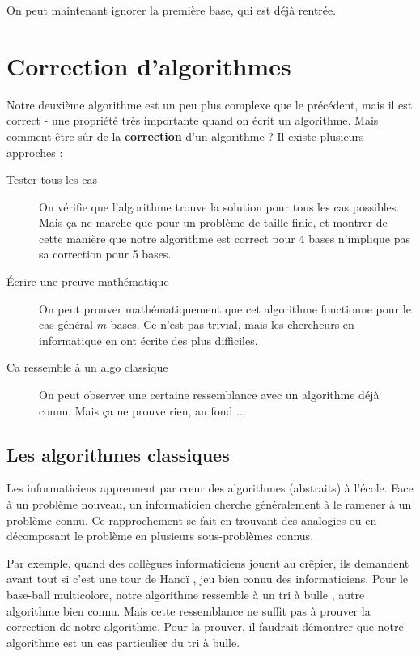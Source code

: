 \documentclass[a5paper,pagesize,DIV=14]{scrbook}
\begin{document}
On peut maintenant ignorer la première base, qui est déjà rentrée.

\section*{Correction d'algorithmes}

Notre deuxième algorithme est un peu plus complexe que le précédent, mais il est correct - une propriété très importante quand on écrit un algorithme. Mais comment être sûr de la \textbf{correction} d'un algorithme ? Il existe plusieurs approches :

\begin{description}
  \item[Tester tous les cas] On vérifie que l'algorithme trouve la solution pour tous les cas possibles. Mais ça ne marche que pour un problème de taille finie, et montrer de cette manière que notre algorithme est correct pour 4 bases n'implique pas sa correction pour 5 bases.
  \item[Écrire une preuve mathématique] On peut prouver mathématiquement que cet algorithme fonctionne pour le cas général $m$ bases. Ce n'est pas trivial, mais les chercheurs en informatique en ont écrite des plus difficiles.
  \item[Ca ressemble à un algo classique] On peut observer une certaine ressemblance avec un algorithme déjà connu. Mais ça ne prouve rien, au fond ...
\end{description}

\subsection*{Les algorithmes classiques}

Les informaticiens apprennent par c\oe{}ur des algorithmes (abstraits) à l'école. Face à un problème nouveau, un informaticien cherche généralement à le ramener à un problème connu. Ce rapprochement se fait en trouvant des analogies ou en décomposant le problème en plusieurs sous-problèmes connus.

Par exemple, quand des collègues informaticiens jouent au crêpier, ils demandent avant tout si c'est \og une tour de Hanoï \fg, jeu bien connu des informaticiens. Pour le base-ball multicolore, notre algorithme ressemble à un \og tri à bulle \fg, autre algorithme bien connu. Mais cette ressemblance ne suffit pas à prouver la correction de notre algorithme. Pour la prouver, il faudrait démontrer que notre algorithme est un cas particulier du tri à bulle.
 
\end{document}
